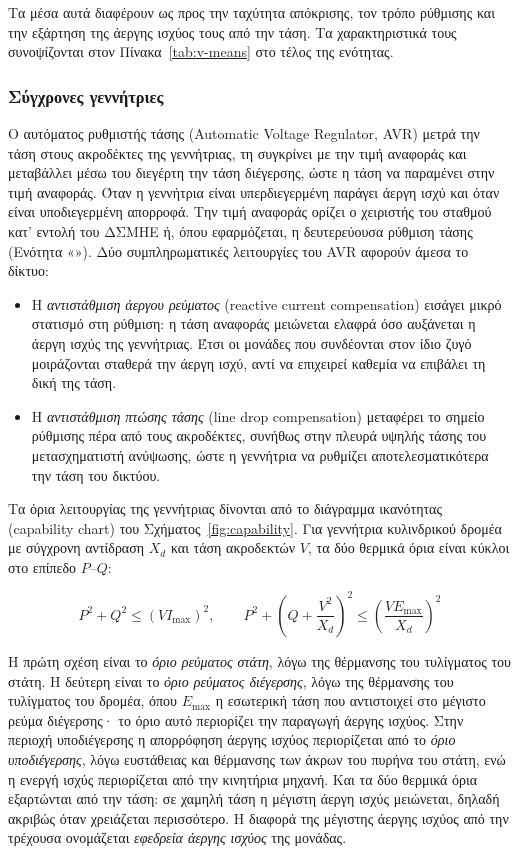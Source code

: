 Τα μέσα αυτά διαφέρουν ως προς την ταχύτητα απόκρισης, τον τρόπο ρύθμισης και την εξάρτηση
της άεργης ισχύος τους από την τάση. Τα χαρακτηριστικά τους συνοψίζονται στον
Πίνακα~\ref{tab:v-means} στο τέλος της ενότητας.

\subsubsection{Σύγχρονες γεννήτριες}
\label{sec:sg}

Ο αυτόματος ρυθμιστής τάσης (Automatic Voltage Regulator, AVR) μετρά την τάση στους
ακροδέκτες της γεννήτριας, τη συγκρίνει με την τιμή αναφοράς και μεταβάλλει μέσω του διεγέρτη
την τάση διέγερσης, ώστε η τάση να παραμένει στην τιμή αναφοράς. Όταν η γεννήτρια είναι
υπερδιεγερμένη παράγει άεργη ισχύ και όταν είναι υποδιεγερμένη απορροφά. Την τιμή αναφοράς
ορίζει ο χειριστής του σταθμού κατ' εντολή του ΔΣΜΗΕ ή, όπου εφαρμόζεται, η δευτερεύουσα
ρύθμιση τάσης (Ενότητα «»). Δύο συμπληρωματικές λειτουργίες του AVR
αφορούν άμεσα το δίκτυο:

\begin{itemize}
\item Η \emph{αντιστάθμιση άεργου ρεύματος} (reactive current compensation) εισάγει μικρό
      στατισμό στη ρύθμιση: η τάση αναφοράς μειώνεται ελαφρά όσο αυξάνεται η άεργη ισχύς της
      γεννήτριας. Έτσι οι μονάδες που συνδέονται στον ίδιο ζυγό μοιράζονται σταθερά την άεργη
      ισχύ, αντί να επιχειρεί καθεμία να επιβάλει τη δική της τάση.
\item Η \emph{αντιστάθμιση πτώσης τάσης} (line drop compensation) μεταφέρει το σημείο
      ρύθμισης πέρα από τους ακροδέκτες, συνήθως στην πλευρά υψηλής τάσης του μετασχηματιστή
      ανύψωσης, ώστε η γεννήτρια να ρυθμίζει αποτελεσματικότερα την τάση του δικτύου.
\end{itemize}

Τα όρια λειτουργίας της γεννήτριας δίνονται από το διάγραμμα ικανότητας (capability chart)
του Σχήματος~\ref{fig:capability}. Για γεννήτρια κυλινδρικού δρομέα με σύγχρονη αντίδραση
$X_d$ και τάση ακροδεκτών $V$, τα δύο θερμικά όρια είναι κύκλοι στο επίπεδο $P$--$Q$:

\begin{equation}
P^2 + Q^2 \le \left(V I_{\max}\right)^2, \qquad
P^2 + \left(Q + \frac{V^2}{X_d}\right)^2 \le \left(\frac{V E_{\max}}{X_d}\right)^2
\label{eq:capability}
\end{equation}

Η πρώτη σχέση είναι το \emph{όριο ρεύματος στάτη}, λόγω της θέρμανσης του τυλίγματος του
στάτη. Η δεύτερη είναι το \emph{όριο ρεύματος διέγερσης}, λόγω της θέρμανσης του τυλίγματος
του δρομέα, όπου $E_{\max}$ η εσωτερική τάση που αντιστοιχεί στο μέγιστο ρεύμα διέγερσης· το
όριο αυτό περιορίζει την παραγωγή άεργης ισχύος. Στην περιοχή υποδιέγερσης η απορρόφηση άεργης
ισχύος περιορίζεται από το \emph{όριο υποδιέγερσης}, λόγω ευστάθειας και θέρμανσης των άκρων
του πυρήνα του στάτη, ενώ η ενεργή ισχύς περιορίζεται από την κινητήρια μηχανή. Και τα δύο
θερμικά όρια εξαρτώνται από την τάση: σε χαμηλή τάση η μέγιστη άεργη ισχύς μειώνεται, δηλαδή
ακριβώς όταν χρειάζεται περισσότερο. Η διαφορά της μέγιστης άεργης ισχύος από την τρέχουσα
ονομάζεται \emph{εφεδρεία άεργης ισχύος} της μονάδας.

